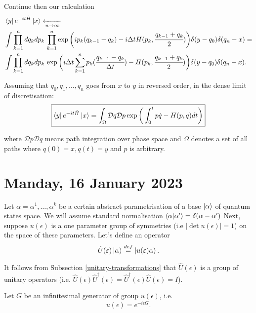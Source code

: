 \documentclass[main.tex]{subfiles}
\begin{document}
Continue then our calculation
\begin{align*}
& \bra{y}e^{-it\hat{H}}\ket{x} \xleftarrow[n \to \infty]{} \\
& \int \prod_{k=1}^n dq_k dp_k\, \prod_{k=1}^n
\exp\bigg(ip_k(q_{k-1} - q_k)- i\Delta t H(p_k, \cfrac{q_{k-1} + q_k}{2})\bigg)
\delta(y - q_0)\delta(q_n - x) = \\
& \int \prod_{k=1}^n dq_k dp_k\, 
\exp\bigg(i\Delta t \sum_{k=1}^n p_k(\cfrac{q_{k-1} - q_k}{\Delta t})- H(p_k, \cfrac{q_{k-1} + q_k}{2})\bigg)
\delta(y - q_0)\delta(q_n - x).
\end{align*}

Assuming that $q_0, q_1, \dots, q_n$ goes from $x$ to $y$ in reversed order, in the dense limit of discretisation:
\begin{equation}
\boxed{
\bra{y}e^{-it\hat{H}}\ket{x}  = 
\int_{\Omega} \mathcal{D} q \mathcal{D} p \exp \bigg(\int_0^t p \dot{q} - H(p, q) dt\bigg)
}
\end{equation} 

where $\mathcal{D} p \mathcal{D} q$ means path integration over phase space and $\Omega$ denotes a set of all paths where $q(0) = x, q(t) = y$ and $p$ is arbitrary.

\section{Manday, 16 January 2023}

Let $\alpha = \alpha^1, \dots, \alpha^k$ be a certain abstract parametrisation of a base $\ket{\alpha}$ of quantum states space. 
We will assume standard normalisation $\bra{\alpha}\ket{\alpha'} = \delta(\alpha - \alpha')$ Next, suppose $u(\epsilon)$ is
a one parameter group of symmetries (i.e $|\det u(\epsilon)| = 1$) on the space of these parameters. Let's define an operator
\begin{equation}
\hat{U}(\varepsilon) \ket{\alpha}  \stackrel{def}{=} \ket{u(\varepsilon) \alpha}.
\end{equation}

It follows from Subsection \ref{unitary-transformations} that $\hat{U}(\epsilon)$ is a group of unitary operators (i.e. $\hat{U}(\epsilon)\hat{U}^\dagger(\epsilon) = \hat{U}^\dagger(\epsilon)\hat{U}(\epsilon) = I$).

Let $G$ be an infinitesimal generator of group $u(\epsilon)$, i.e.
\begin{equation}
u(\epsilon) = e^{-i\epsilon G}.
\end{equation}
\end{document}
